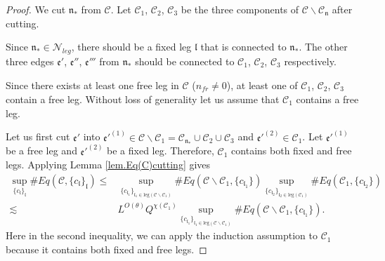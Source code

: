 \begin{proof}
We cut $\mathfrak{n}_*$ from $\mathcal{C}$. Let $\mathcal{C}_1$, $\mathcal{C}_2$, $\mathcal{C}_3$ be the three components of $\mathcal{C}\backslash \mathcal{C}_{\mathfrak{n}}$ after cutting.

Since $\mathfrak{n}_*\in \mathcal{N}_{leg}$, there should be a fixed leg $\mathfrak{l}$ that is connected to $\mathfrak{n}_*$. The other three edges $\mathfrak{e}'$, $\mathfrak{e}''$, $\mathfrak{e}'''$ from $\mathfrak{n}_*$ should be connected to $\mathcal{C}_1$, $\mathcal{C}_2$, $\mathcal{C}_3$ respectively.  

Since there exists at least one free leg in $\mathcal{C}$  ($n_{\textit{fr}}\ne 0$), at least one of $\mathcal{C}_1$, $\mathcal{C}_2$, $\mathcal{C}_3$ contain a free leg. Without loss of generality let us assume that $\mathcal{C}_1$ contains a free leg.

Let us first cut $\mathfrak{e}'$ into $\mathfrak{e}'^{(1)}\in  \mathcal{C}\backslash\mathcal{C}_1=\mathcal{C}_{\mathfrak{n}_*}\cup \mathcal{C}_2\cup \mathcal{C}_3$ and $\mathfrak{e}'^{(2)}\in  \mathcal{C}_1$. Let $\mathfrak{e}'^{(1)}$ be a free leg and $\mathfrak{e}'^{(2)}$ be a fixed leg. Therefore, $\mathcal{C}_1$ contains both fixed and free legs. Applying Lemma \ref{lem.Eq(C)cutting} gives
\begin{equation}\label{eq.case2expand}
\begin{split}
    \sup_{\{c_{\mathfrak{l}}\}_{\mathfrak{l}}}\#Eq(\mathcal{C},\{c_{\mathfrak{l}}\}_{\mathfrak{l}})\le&
    \sup_{\{c_{\mathfrak{l}_1}\}_{\mathfrak{l}_1\in \text{leg}(\mathcal{C}\backslash\mathcal{C}_1)} } \# Eq(\mathcal{C}\backslash\mathcal{C}_1,\{c_{\mathfrak{l}_1}\}) \sup_{\{c_{\mathfrak{l}_2}\}_{\mathfrak{l}_2\in \text{leg}(\mathcal{C}_1)} }\# Eq(\mathcal{C}_{1}, \{c_{\mathfrak{l}_2}\})
    \\
    \lesssim&  L^{O(\theta)} Q^{\chi(\mathcal{C}_1)}\sup_{\{c_{\mathfrak{l}_1}\}_{\mathfrak{l}_1\in \text{leg}(\mathcal{C}\backslash\mathcal{C}_1)} } \# Eq(\mathcal{C}\backslash\mathcal{C}_1,\{c_{\mathfrak{l}_1}\}).
\end{split}
\end{equation}
Here in the second inequality, we can apply the induction assumption to $\mathcal{C}_1$ because it contains both fixed and free legs.


\end{proof}
